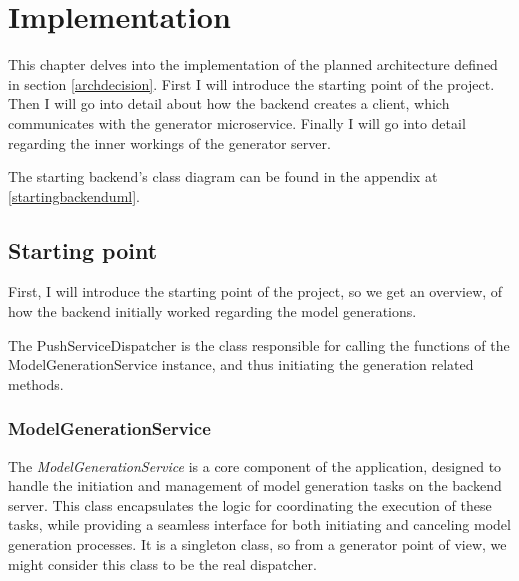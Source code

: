 \chapter{Implementation} \label{Implementation}

	This chapter delves into the implementation of the planned architecture defined in section \ref{archdecision}.
	First I will introduce the starting point of the project.
	Then I will go into detail about how the backend creates a client, which communicates with the generator microservice. Finally I will go into detail
	regarding the inner workings of the generator server.

	The starting backend's class diagram can be found in the appendix at \ref{startingbackenduml}.

	\section{Starting point} \label{Starting point}
		First, I will introduce the starting point of the project, so we get an overview, of how the backend initially worked regarding the model
		generations.

		The PushServiceDispatcher is the class responsible for calling the functions of the ModelGenerationService instance, and thus initiating
		the generation related methods.

		\subsection{ModelGenerationService} \label{ModelGenerationService}
			The \textit{ModelGenerationService} is a core component of the application, designed to handle the initiation and management of
			model generation tasks on the backend server. This class encapsulates the logic for coordinating the execution of these 
			tasks, while providing a seamless interface for both initiating and canceling model generation processes.
			It is a singleton class, so from a generator point of view, we might consider this class to be the real dispatcher.

